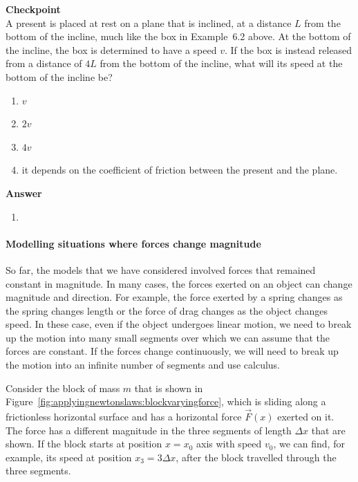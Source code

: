 \begin{framed}
\textbf{Checkpoint}\\
A present is placed at rest on a plane that is inclined, at a distance $L$ from the bottom of the incline, much like the box in Example~6.2 above. At the bottom of the incline, the box is determined to have a speed $v$. If the box is instead released from a distance of $4L$ from the bottom of the incline, what will its speed at the bottom of the incline be?

\begin{enumerate}
\item $v$
\item $2v$
\item $4v$
\item it depends on the coefficient of friction between the present and the plane.
\end{enumerate}

\begin{framed}
\textbf{Answer}\\
\begin{enumerate}[resume]
\item
\end{enumerate}
\end{framed}
\end{framed}

\paragraph{Modelling situations where forces change magnitude}\label{sec:applyingnewtonslaws:modellingwhereforcechanges}

So far, the models that we have considered involved forces that remained constant in magnitude. In many cases, the forces exerted on an object can change magnitude and direction. For example, the force exerted by a spring changes as the spring changes length or the force of drag changes as the object changes speed. In these case, even if the object undergoes linear motion, we need to break up the motion into many small segments over which we can assume that the forces are constant. If the forces change continuously, we will need to break up the motion into an infinite number of segments and use calculus.

Consider the block of mass $m$ that is shown in Figure~\ref{fig:applyingnewtonslaws:blockvaryingforce}, which is sliding along a frictionless horizontal surface and has a  horizontal force $\vec F(x)$ exerted on it. The force has a different magnitude in the three segments of length $\Delta x$ that are shown. If the block starts at position $x=x_0$ axis with speed $v_0$, we can find, for example, its speed at position $x_3=3\Delta x$, after the block travelled through the three segments.


